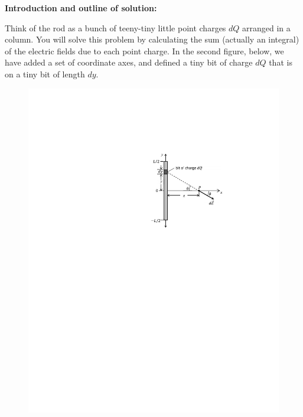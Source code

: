 \vspace{1cm}

\textbf{Introduction and outline of solution:}

Think of the rod as a bunch of teeny-tiny little point charges $dQ$ arranged in a column. You will solve this problem by calculating the sum (actually an integral) of the electric fields due to each point charge.  In the second figure, below, we have added a set of coordinate axes, and defined a tiny bit of charge $dQ$ that is on a tiny bit of length $dy$.  
\par

\begin{figure}
\vspace{-.55in}
   \includegraphics{electric_field_near_a_charged_rod/fig2.pdf}
\end{figure}


